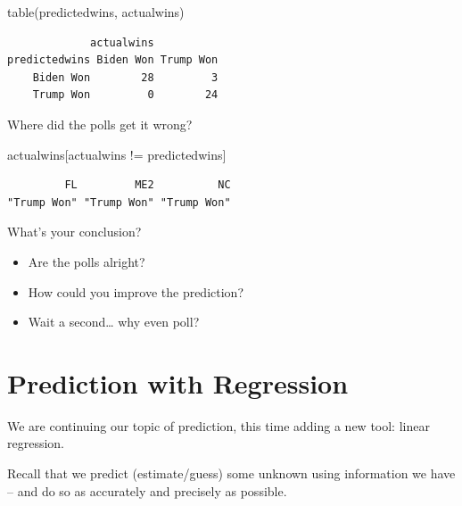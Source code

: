 \documentclass[
  letterpaper,
  DIV=11,
  numbers=noendperiod]{scrreprt}
\newenvironment{Shaded}{\begin{snugshade}}{\end{snugshade}}
\newcommand{\FunctionTok}[1]{\textcolor[rgb]{0.28,0.35,0.67}{#1}}
\newcommand{\NormalTok}[1]{\textcolor[rgb]{0.00,0.23,0.31}{#1}}
\newcommand{\SpecialCharTok}[1]{\textcolor[rgb]{0.37,0.37,0.37}{#1}}
\providecommand{\tightlist}{%
  \setlength{\itemsep}{0pt}\setlength{\parskip}{0pt}}\usepackage{longtable,booktabs,array}
\begin{document}
\begin{Shaded}
\begin{Highlighting}[]
\FunctionTok{table}\NormalTok{(predictedwins, actualwins)}
\end{Highlighting}
\end{Shaded}

\begin{verbatim}
             actualwins
predictedwins Biden Won Trump Won
    Biden Won        28         3
    Trump Won         0        24
\end{verbatim}

Where did the polls get it wrong?

\begin{Shaded}
\begin{Highlighting}[]
\NormalTok{actualwins[actualwins }\SpecialCharTok{!=}\NormalTok{ predictedwins]}
\end{Highlighting}
\end{Shaded}

\begin{verbatim}
         FL         ME2          NC 
"Trump Won" "Trump Won" "Trump Won" 
\end{verbatim}

What's your conclusion?

\begin{itemize}
\tightlist
\item
  Are the polls alright?
\item
  How could you improve the prediction?
\item
  Wait a second\ldots{} why even poll?
\end{itemize}


\hypertarget{regression}{%
\chapter{Prediction with Regression}\label{regression}}

We are continuing our topic of prediction, this time adding a new tool:
linear regression.

Recall that we predict (estimate/guess) some unknown using information
we have -- and do so as accurately and precisely as possible.
\end{document}
